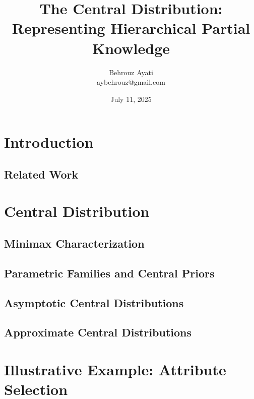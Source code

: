 \documentclass[12pt]{article}
\title{The Central Distribution: Representing Hierarchical Partial Knowledge}
\author{Behrouz Ayati \\ aybehrouz@gmail.com}
\date{July 11, 2025}
\theoremstyle{definition}
\newif\iffullversion
\begin{document}
    \maketitle

    

    \section{Introduction}\label{sec:intro}
    

    \subsection{Related Work}\label{subsec:related-work}
    

    \iffullversion
    \subsection{Divergence}\label{subsec:dive}
    
    \fi

    \section{Central Distribution}\label{sec:central}
    

    \subsection{Minimax Characterization}\label{subsec:minimax}
    

    \subsection{Parametric Families and Central Priors}\label{subsec:parametric}
    

    \subsection{Asymptotic Central Distributions}\label{subsec:asymptotic-cd}
    

    \subsection{Approximate Central Distributions}\label{subsec:approx-cd}
    

    \section{Illustrative Example: Attribute Selection}\label{sec:attribute-selection}
    
\end{document}

